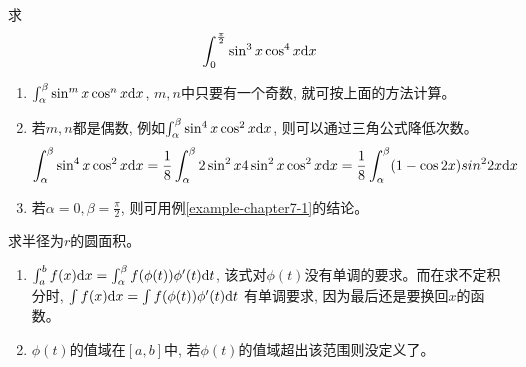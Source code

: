 \begin{example}
    求
    \begin{equation*}
        \int_0^{\frac{\pi}{2}} \sin^3x\cos^4x \mathrm{d} x
    \end{equation*}
\end{example}
\begin{solution}
    
\end{solution}
\begin{remark}
    \begin{enumerate}
        \item $\int_\alpha^\beta \sin^mx\cos^nx \mathrm{d} x$, $m, n$中只要有一个奇数, 就可按上面的方法计算。
        \item 若$m, n$都是偶数, 例如$\int_\alpha^\beta \sin^4x\cos^2x \mathrm{d} x$, 则可以通过三角公式降低次数。
        \begin{equation*}
            \int_\alpha^\beta \sin^4x\cos^2x \mathrm{d} x = \frac{1}{8}\int_\alpha^\beta 2\sin^2x 4\sin^2x\cos^2x \mathrm{d} x = \frac{1}{8} \int_\alpha^\beta (1-\cos2x)sin^22x \mathrm{d} x
        \end{equation*}
        \item 若$\alpha = 0, \beta = \frac{\pi}{2}$, 则可用例\ref{example-chapter7-1}的结论。
    \end{enumerate}
\end{remark}

\begin{example}
    求半径为$r$的圆面积。
\end{example}
\begin{solution}
    
\end{solution}
\begin{remark}
    \begin{enumerate}
        \item $\int_a^bf(x)\mathrm{d} x = \int_\alpha^\beta f(\phi(t))\phi'(t)\mathrm{d} t$, 该式对$\phi(t)$没有单调的要求。而在求不定积分时, $\int f(x)\mathrm{d} x = \int f(\phi(t))\phi'(t)\mathrm{d} t$ 有单调要求, 因为最后还是要换回$x$的函数。
        \item $\phi(t)$的值域在$[a, b]$中, 若$\phi(t)$的值域超出该范围则没定义了。
    \end{enumerate}
\end{remark}